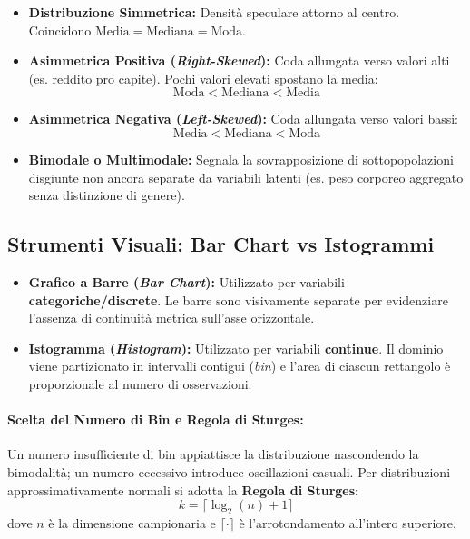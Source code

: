 \begin{itemize}
    \item \textbf{Distribuzione Simmetrica:} Densit\`a speculare attorno al centro. Coincidono $\text{Media} = \text{Mediana} = \text{Moda}$.
    \item \textbf{Asimmetrica Positiva (\textit{Right-Skewed}):} Coda allungata verso valori alti (es. reddito pro capite). Pochi valori elevati spostano la media:
    \begin{equation}
        \text{Moda} < \text{Mediana} < \text{Media}
    \end{equation}
    \item \textbf{Asimmetrica Negativa (\textit{Left-Skewed}):} Coda allungata verso valori bassi:
    \begin{equation}
        \text{Media} < \text{Mediana} < \text{Moda}
    \end{equation}
    \item \textbf{Bimodale o Multimodale:} Segnala la sovrapposizione di sottopopolazioni disgiunte non ancora separate da variabili latenti (es. peso corporeo aggregato senza distinzione di genere).
\end{itemize}

\FloatBarrier
\subsection{Strumenti Visuali: Bar Chart vs Istogrammi}
\begin{itemize}
    \item \textbf{Grafico a Barre (\textit{Bar Chart}):} Utilizzato per variabili \textbf{categoriche/discrete}. Le barre sono visivamente separate per evidenziare l'assenza di continuit\`a metrica sull'asse orizzontale.
    \item \textbf{Istogramma (\textit{Histogram}):} Utilizzato per variabili \textbf{continue}. Il dominio viene partizionato in intervalli contigui (\textit{bin}) e l'area di ciascun rettangolo \`e proporzionale al numero di osservazioni.
\end{itemize}

\paragraph{Scelta del Numero di Bin e Regola di Sturges:}
Un numero insufficiente di bin appiattisce la distribuzione nascondendo la bimodalit\`a; un numero eccessivo introduce oscillazioni casuali. Per distribuzioni approssimativamente normali si adotta la \textbf{Regola di Sturges}:
\begin{equation}
    k = \lceil \log_2(n) + 1 \rceil
\end{equation}
dove $n$ \`e la dimensione campionaria e $\lceil \cdot \rceil$ \`e l'arrotondamento all'intero superiore.

